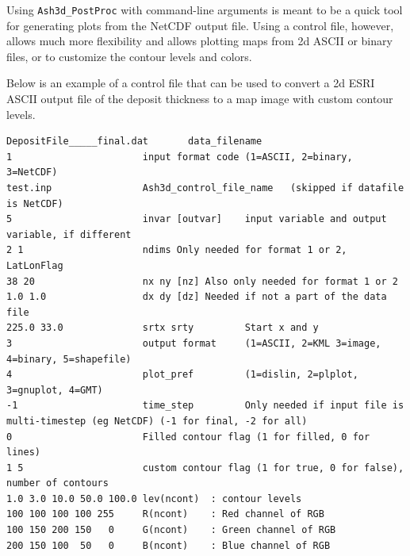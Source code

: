 Using \texttt{Ash3d\_PostProc} with command-line arguments is meant to be a
quick tool for generating plots from the NetCDF output file. Using a control
file, however, allows much more flexibility and allows plotting maps
from 2d ASCII or binary files, or to customize the contour levels and colors.

Below is an example of a control file that can be used to convert a 2d ESRI ASCII
output file of the deposit thickness to a map image with custom contour levels.

\small
\begin{verbatim}
DepositFile_____final.dat       data_filename
1                       input format code (1=ASCII, 2=binary, 3=NetCDF)
test.inp                Ash3d_control_file_name   (skipped if datafile is NetCDF)
5                       invar [outvar]    input variable and output variable, if different
2 1                     ndims Only needed for format 1 or 2, LatLonFlag
38 20                   nx ny [nz] Also only needed for format 1 or 2
1.0 1.0                 dx dy [dz] Needed if not a part of the data file
225.0 33.0              srtx srty         Start x and y
3                       output format     (1=ASCII, 2=KML 3=image, 4=binary, 5=shapefile)
4                       plot_pref         (1=dislin, 2=plplot, 3=gnuplot, 4=GMT)
-1                      time_step         Only needed if input file is multi-timestep (eg NetCDF) (-1 for final, -2 for all)
0                       Filled contour flag (1 for filled, 0 for lines)
1 5                     custom contour flag (1 for true, 0 for false), number of contours
1.0 3.0 10.0 50.0 100.0 lev(ncont)  : contour levels
100 100 100 100 255     R(ncont)    : Red channel of RGB
100 150 200 150   0     G(ncont)    : Green channel of RGB
200 150 100  50   0     B(ncont)    : Blue channel of RGB
\end{verbatim}
\normalsize

